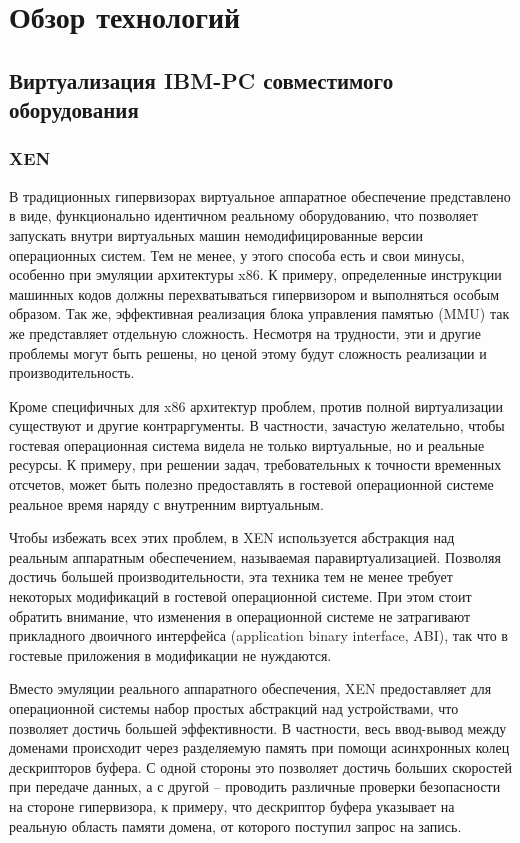 \chapter{Обзор технологий}

\section{Виртуализация IBM-PC совместимого оборудования}

\subsection{XEN}


В традиционных гипервизорах виртуальное аппаратное обеспечение представлено в 
виде, функционально идентичном реальному оборудованию, что позволяет запускать
внутри виртуальных машин немодифицированные версии операционных систем. Тем не менее,
у этого способа есть и свои минусы, особенно при эмуляции архитектуры x86. К примеру,
определенные инструкции машинных кодов должны перехватываться гипервизором
и выполняться особым образом. Так же, эффективная реализация блока управления памятью
(MMU) так же представляет отдельную сложность. Несмотря на трудности, эти и другие 
проблемы могут быть решены, но ценой этому будут сложность реализации и производительность.

Кроме специфичных для x86 архитектур проблем, против полной виртуализации существуют
и другие контраргументы. В частности, зачастую желательно, чтобы гостевая операционная
система видела не только виртуальные, но и реальные ресурсы. К примеру, при решении
задач, требовательных к точности временных отсчетов, может быть полезно предоставлять
в гостевой операционной системе реальное время наряду с внутренним виртуальным.

Чтобы избежать всех этих проблем, в XEN используется абстракция над реальным аппаратным
обеспечением, называемая паравиртуализацией. Позволяя достичь большей производительности,
эта техника тем не менее требует некоторых модификаций в гостевой операционной системе.
При этом стоит обратить внимание, что изменения в операционной системе не затрагивают
прикладного двоичного интерфейса (application binary interface, ABI), так что в гостевые
приложения в модификации не нуждаются.


Вместо эмуляции реального аппаратного обеспечения, XEN предоставляет для операционной
системы набор простых абстракций над устройствами, что позволяет достичь большей
эффективности. В частности, весь ввод-вывод между доменами происходит через разделяемую
память при помощи асинхронных колец дескрипторов буфера. С одной стороны это позволяет
достичь больших скоростей при передаче данных, а с другой -- проводить различные 
проверки безопасности на стороне гипервизора, к примеру, что дескриптор буфера указывает
на реальную область памяти домена, от которого поступил запрос на запись.


